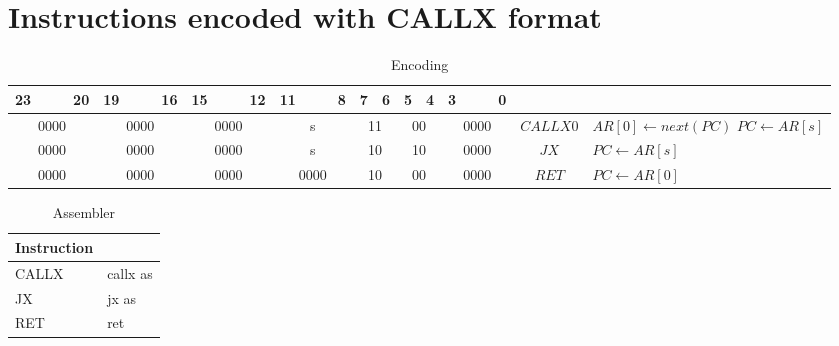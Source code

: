 \section{Instructions encoded with CALLX format}
	\begin{longtable}{llllllllllllllllllllllll  p{1cm}  p{6cm} | }
		\caption{Encoding\label{long}}\\
		23 & & & 20 & 19 & & & 16 & 15 & & & 12 & 11 & & & 8 & 7 & 6 & 5 & 4 & 3 & & & 0 & & \multicolumn{1}{c}{}\\
		\hline
		\multicolumn{4}{|c|}{0000} & \multicolumn{4}{c|}{0000} & \multicolumn{4}{c|}{0000} & \multicolumn{4}{c|}{s} & \multicolumn{2}{c|}{11} & \multicolumn{2}{c|}{00} & \multicolumn{4}{c|}{0000} & \multicolumn{1}{c|}{$CALLX0$} & $AR[0] \leftarrow next(PC)$ \newline $PC \leftarrow AR[s]$\\ \hline
		\multicolumn{4}{|c|}{0000} & \multicolumn{4}{c|}{0000} & \multicolumn{4}{c|}{0000} & \multicolumn{4}{c|}{s} & \multicolumn{2}{c|}{10} & \multicolumn{2}{c|}{10} & \multicolumn{4}{c|}{0000} & \multicolumn{1}{c|}{$JX$} & $PC \leftarrow AR[s]$\\ \hline
		\multicolumn{4}{|c|}{0000} & \multicolumn{4}{c|}{0000} & \multicolumn{4}{c|}{0000} & \multicolumn{4}{c|}{0000} & \multicolumn{2}{c|}{10} & \multicolumn{2}{c|}{00} & \multicolumn{4}{c|}{0000} & \multicolumn{1}{c|}{$RET$} & $PC \leftarrow AR[0]$\\ \hline
	\end{longtable}

	\begin{longtable}{|p{5cm}|p{5cm}|}
		\caption{Assembler\label{long}}\\
		\hline
		Instruction & \\
		\hline
		CALLX & callx as\\ \hline
		JX & jx as\\ \hline
		RET & ret \\ \hline
	\end{longtable}
